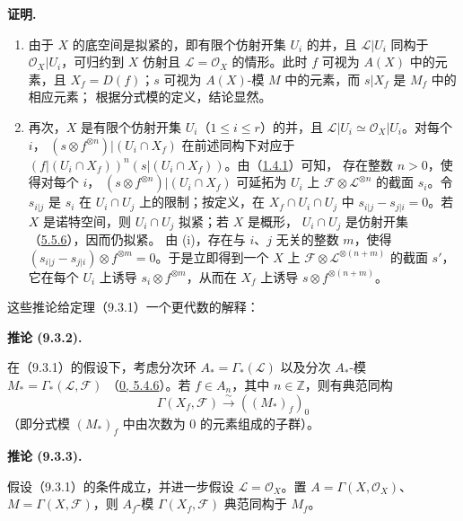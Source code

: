 \documentclass[UTF8,fontset=none,11pt,oneside,openany]{ctexbook}
\newenvironment{corollary}[1][]{%
  \par\medskip\noindent\textbf{推论 (#1).}\ %
}{\par}
\newenvironment{proof}{%
  \par\medskip\noindent\textbf{证明.}\ %
}{\par}
\newcommand{\oldpage}[2][]{%
  \hypertarget{ega-source-page-#1-#2}{}%
  \marginnote{\scriptsize\textbf{#1}~|~#2}\ignorespaces}
\let\EGAOriginalLabel\label
\renewcommand{\label}[1]{\phantomsection\EGAOriginalLabel{#1}}
\begin{document}
\begin{proof}
\begin{enumerate}
\item[(i)] 由于 $X$ 的底空间是拟紧的，即有限个仿射开集 $U_i$ 的并，且
$\mathscr{L}|U_i$ 同构于 $\mathscr{O}_X|U_i$，可归约到 $X$ 仿射且
$\mathscr{L}=\mathscr{O}_X$ 的情形。此时 $f$ 可视为 $A(X)$ 中的元素，且
$X_f=D(f)$；$s$ 可视为 $A(X)$-模 $M$ 中的元素，而 $s|X_f$ 是 $M_f$ 中的相应元素；
根据分式模的定义，结论显然。
\oldpage[I]{173}

\item[(ii)] 再次，$X$ 是有限个仿射开集 $U_i$（$1\leq i\leq r$）的并，且
$\mathscr{L}|U_i\simeq\mathscr{O}_X|U_i$。对每个 $i$，
$(s\otimes f^{\otimes n})|(U_i\cap X_f)$ 在前述同构下对应于
$(f|(U_i\cap X_f))^n(s|(U_i\cap X_f))$。由（\hyperref[I.1.4.1-fr]{1.4.1}）可知，
存在整数 $n>0$，使得对每个 $i$，
$(s\otimes f^{\otimes n})|(U_i\cap X_f)$ 可延拓为 $U_i$ 上
$\mathscr{F}\otimes\mathscr{L}^{\otimes n}$ 的截面 $s_i$。令 $s_{i|j}$ 是 $s_i$ 在
$U_i\cap U_j$ 上的限制；按定义，在 $X_f\cap U_i\cap U_j$ 中
$s_{i|j}-s_{j|i}=0$。若 $X$ 是诺特空间，则 $U_i\cap U_j$ 拟紧；若 $X$ 是概形，
$U_i\cap U_j$ 是仿射开集（\hyperref[I.5.5.6-fr]{5.5.6}），因而仍拟紧。
由 (i)，存在与 $i$、$j$ 无关的整数 $m$，使得
$(s_{i|j}-s_{j|i})\otimes f^{\otimes m}=0$。于是立即得到一个
$X$ 上 $\mathscr{F}\otimes\mathscr{L}^{\otimes(n+m)}$ 的截面 $s'$，它在每个
$U_i$ 上诱导 $s_i\otimes f^{\otimes m}$，从而在 $X_f$ 上诱导
$s\otimes f^{\otimes(n+m)}$。
\end{enumerate}
\end{proof}

这些推论给定理（9.3.1）一个更代数的解释：

\begin{corollary}[9.3.2]
\label{I.9.3.2-fr}
在（9.3.1）的假设下，考虑分次环
$A_* = \Gamma_*(\mathscr{L})$ 以及分次 $A_*$-模
$M_* = \Gamma_*(\mathscr{L},\mathscr{F})$
（\hyperref[0.5.4.6-fr]{0, 5.4.6}）。若 $f\in A_n$，其中 $n\in\mathbb{Z}$，则有典范同构
\[
  \Gamma(X_f,\mathscr{F})\xrightarrow{\sim}((M_*)_f)_0
\]
（即分式模 $(M_*)_f$ 中由次数为 $0$ 的元素组成的子群）。
\end{corollary}

\begin{corollary}[9.3.3]
\label{I.9.3.3-fr}
假设（9.3.1）的条件成立，并进一步假设
$\mathscr{L}=\mathscr{O}_X$。置 $A=\Gamma(X,\mathscr{O}_X)$、
$M=\Gamma(X,\mathscr{F})$，则 $A_f$-模
$\Gamma(X_f,\mathscr{F})$ 典范同构于 $M_f$。
\end{corollary}
\end{document}
